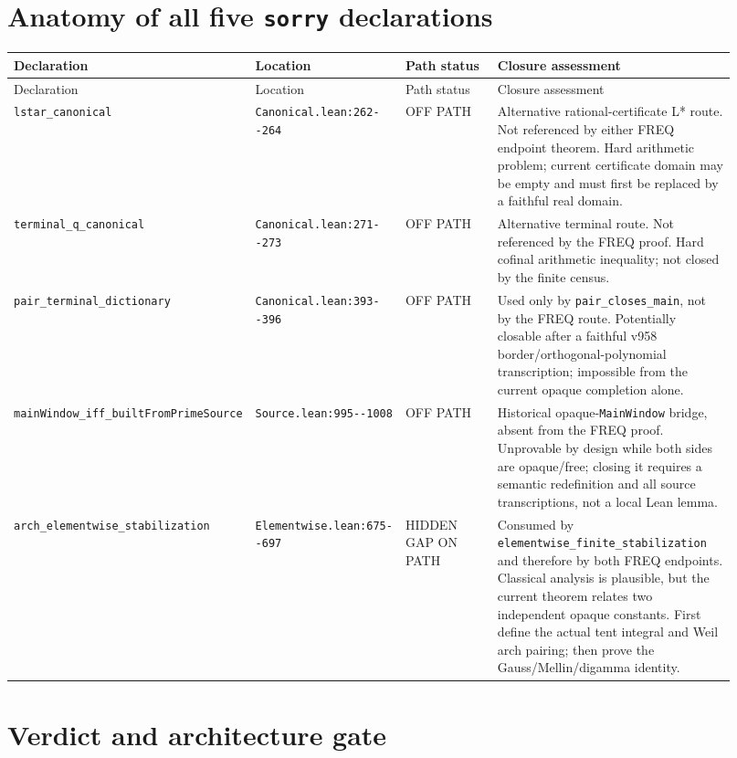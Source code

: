 \documentclass[10pt]{article}
\newcommand{\gap}{\textcolor{red!75!black}{HIDDEN GAP}}
\newcommand{\off}{\textcolor{gray!75!black}{OFF PATH}}
\newcommand{\code}[1]{\nolinkurl{#1}}
\begin{document}
\section{Anatomy of all five \code{sorry} declarations}

\begin{longtable}{@{}p{0.25\linewidth}p{0.16\linewidth}p{0.16\linewidth}p{0.35\linewidth}@{}}
\toprule
Declaration & Location & Path status & Closure assessment \\
\midrule
\endfirsthead
\toprule
Declaration & Location & Path status & Closure assessment \\
\midrule
\endhead
\code{lstar_canonical} & \code{Canonical.lean:262--264} & \off &
Alternative rational-certificate L* route.  Not referenced by either
FREQ endpoint theorem.  Hard arithmetic problem; current certificate
domain may be empty and must first be replaced by a faithful real
domain. \\

\code{terminal_q_canonical} & \code{Canonical.lean:271--273} & \off &
Alternative terminal route.  Not referenced by the FREQ proof.
Hard cofinal arithmetic inequality; not closed by the finite census. \\

\code{pair_terminal_dictionary} & \code{Canonical.lean:393--396} & \off &
Used only by \code{pair_closes_main}, not by the FREQ route.
Potentially closable after a faithful v958 border/orthogonal-polynomial
transcription; impossible from the current opaque completion alone. \\

\code{mainWindow_iff_builtFromPrimeSource} &
\code{Source.lean:995--1008} & \off &
Historical opaque-\code{MainWindow} bridge, absent from the FREQ proof.
Unprovable by design while both sides are opaque/free; closing it
requires a semantic redefinition and all source transcriptions, not a
local Lean lemma. \\

\code{arch_elementwise_stabilization} &
\code{Elementwise.lean:675--697} & \gap{} ON PATH &
Consumed by \code{elementwise_finite_stabilization} and therefore by
both FREQ endpoints.  Classical analysis is plausible, but the current
theorem relates two independent opaque constants.  First define the
actual tent integral and Weil arch pairing; then prove the
Gauss/Mellin/digamma identity. \\
\bottomrule
\end{longtable}

\section{Verdict and architecture gate}
\end{document}
